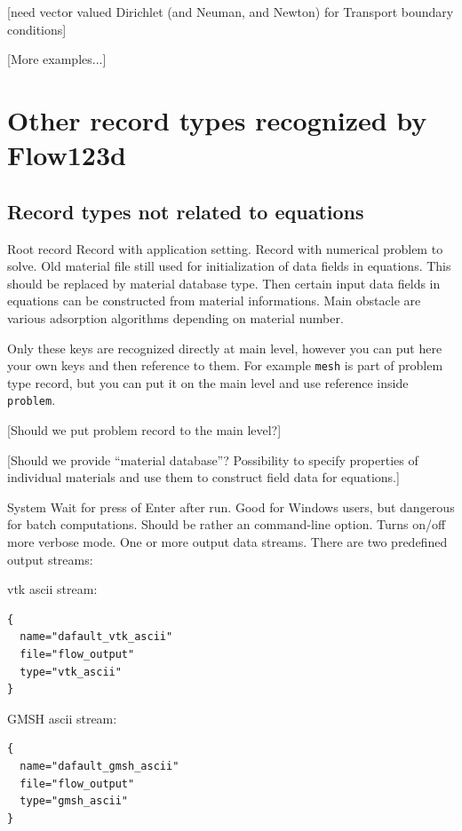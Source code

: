 \documentclass[12pt,a4paper]{report}
\begin{document}
[need vector valued Dirichlet (and Neuman, and Newton) for Transport boundary conditions]

[More examples...]


\section{Other record types recognized by Flow123d}

\subsection{Record types not related to equations}

\begin{recordtype}{Root record}{}
  Record with application setting.
  Record with numerical problem to solve. 
    Old material file still used for initialization of data fields in equations. 
    This should be replaced by material database type. Then certain input data fields in equations can be 
    constructed from material informations. Main obstacle are various adsorption algorithms depending on material number.
\end{recordtype}

Only these  keys are recognized directly at main level, however you can put here your own keys and then reference
to them. For example \verb'mesh' is part of problem type record, but you can put it on the main level and use reference 
inside \verb'problem'. 

[Should we put problem record to the main level?]

[Should we provide ``material database''? Possibility to specify properties of individual materials and use them to construct
 field data for equations.]

\begin{recordtype}{System}{}
Wait for press of Enter after run. Good for Windows users, but dangerous for batch computations. 
Should be rather an command-line option.
Turns on/off more verbose mode. 
One or more output data streams.
There are two predefined output streams:


vtk ascii stream:
\begin{verbatim}
{
  name="dafault_vtk_ascii"
  file="flow_output"
  type="vtk_ascii"
}
\end{verbatim}

GMSH ascii stream:
\begin{verbatim}
{
  name="dafault_gmsh_ascii"
  file="flow_output"
  type="gmsh_ascii"
}
\end{verbatim}

\end{recordtype}
\end{document}
